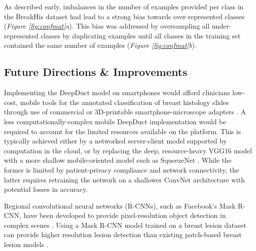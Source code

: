 As described early, imbalances in the number of examples provided per class in the BreakHis dataset had lead to a strong bias towards over-represented classes (\textit{Figure \ref{fig:confmat}a}). This bias was addressed by oversampling all under-represented classes by duplicating examples until all classes in the training set contained the same number of examples (\textit{Figure \ref{fig:confmat}b}).

\subsection{Future Directions \& Improvements}

Implementing the DeepDuct model on smartphones would afford clinicians low-cost, mobile tools for the annotated classification of breast histology slides through use of commercial or 3D-printable smartphone-microscope adapters \citep{cellphone_microscope_platform}. A less computationally-complex mobile DeepDuct implementation would be required to account for the limited resources available on the platform. This is typically achieved either by a networked server-client model supported by computation in the cloud, or by replacing the deep, resource-heavy VGG16 model with a more shallow mobile-oriented model such as SqueezeNet \citep{squeezenet}. While the former is limited by patient-privacy compliance and network connectivity, the latter requires retraining the network on a shallower ConvNet architecture with potential losses in accuracy.

Regional convolutional neural networks (R-CNNs), such as Facebook's Mask R-CNN, have been developed to provide pixel-resolution object detection in complex scenes \citep{mask_r_cnn}. Using a Mask R-CNN model trained on a breast lesion dataset can provide higher resolution lesion detection than existing patch-based breast lesion models \citep{wang2016}.





 